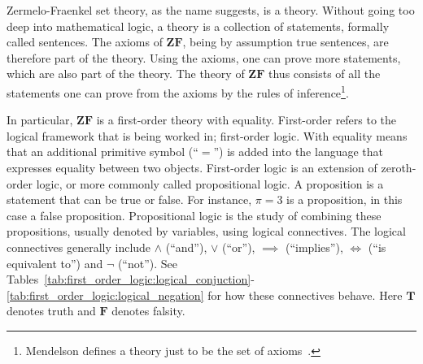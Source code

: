 \documentclass[../main.tex]{subfiles}
\begin{document}
\setcounter{section}{1}
Zermelo-Fraenkel set theory, as the name suggests, is a theory. Without going too deep into mathematical logic, a theory is a collection of statements, formally called sentences. The axioms of $\mathbf{ZF}$, being by assumption true sentences, are therefore part of the theory. Using the axioms, one can prove more statements, which are also part of the theory. The theory of $\mathbf{ZF}$ thus consists of all the statements one can prove from the axioms by the rules of inference\footnote{Mendelson defines a theory just to be the set of axioms~\cite{Mendelson1997}.}.

In particular, $\mathbf{ZF}$ is a first-order theory with equality. First-order refers to the logical framework that is being worked in; first-order logic. With equality means that an additional primitive symbol (``$=$'') is added into the language that expresses equality between two objects. First-order logic is an extension of zeroth-order logic, or more commonly called propositional logic. A proposition is a statement that can be true or false. For instance, $\pi=3$ is a proposition, in this case a false proposition. Propositional logic is the study of combining these propositions, usually denoted by variables, using logical connectives. The logical connectives generally include $\land$ (``and''), $\lor$ (``or''), $\implies$ (``implies''), $\iff$ (``is equivalent to'') and $\lnot$ (``not''). See Tables~\ref{tab:first_order_logic:logical_conjuction}\nobreakdash-\ref{tab:first_order_logic:logical_negation} for how these connectives behave. Here $\mathbf{T}$ denotes truth and $\mathbf{F}$ denotes falsity.
\end{document}
